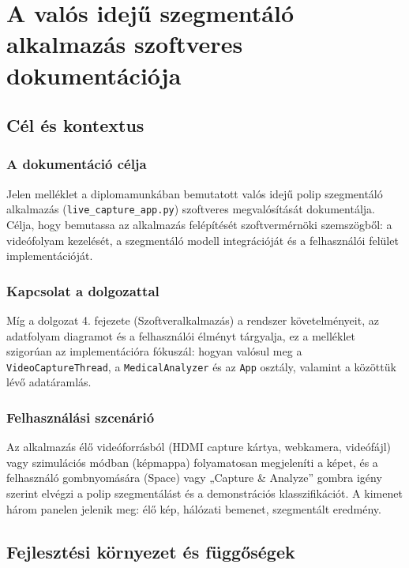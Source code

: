 \chapter{A valós idejű szegmentáló alkalmazás szoftveres dokumentációja}

\section{Cél és kontextus}

\subsection{A dokumentáció célja}
Jelen melléklet a diplomamunkában bemutatott valós idejű polip szegmentáló alkalmazás (\texttt{live\_capture\_app.py}) szoftveres megvalósítását dokumentálja. Célja, hogy bemutassa az alkalmazás felépítését szoftvermérnöki szemszögből: a videófolyam kezelését, a szegmentáló modell integrációját és a felhasználói felület implementációját.

\subsection{Kapcsolat a dolgozattal}
Míg a dolgozat 4. fejezete (Szoftveralkalmazás) a rendszer követelményeit, az adatfolyam diagramot és a felhasználói élményt tárgyalja, ez a melléklet szigorúan az implementációra fókuszál: hogyan valósul meg a \texttt{VideoCaptureThread}, a \texttt{MedicalAnalyzer} és az \texttt{App} osztály, valamint a közöttük lévő adatáramlás.

\subsection{Felhasználási szcenárió}
Az alkalmazás élő videóforrásból (HDMI capture kártya, webkamera, videófájl) vagy szimulációs módban (képmappa) folyamatosan megjeleníti a képet, és a felhasználó gombnyomására (Space) vagy „Capture \& Analyze” gombra igény szerint elvégzi a polip szegmentálást és a demonstrációs klasszifikációt. A kimenet három panelen jelenik meg: élő kép, hálózati bemenet, szegmentált eredmény.

\section{Fejlesztési környezet és függőségek}

